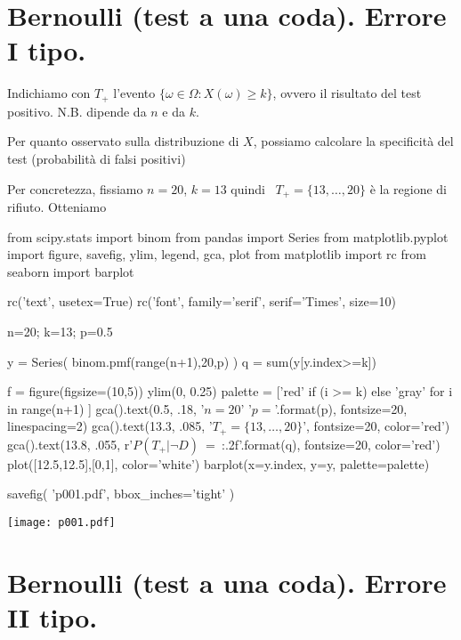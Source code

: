 \documentclass[10pt,openany]{book}
\theoremstyle{mio}
\theoremstyle{liscio}
\begin{document}
\clearpage\section{Bernoulli (test a una coda). Errore I tipo.}

Indichiamo con $T_+$ l'evento $\{\omega\in\Omega: X(\omega)\ge k\}$, ovvero il risultato del test positivo. N.B. dipende da $n$ e da $k$.

Per quanto osservato sulla distribuzione di $X$, possiamo calcolare la specificità del test (probabilità di falsi positivi)



Per concretezza, fissiamo $n=20$, $k=13$ quindi {\color{red}\boldmath\ $T_+=\{13,\dots,20\}$} è la regione di rifiuto. Otteniamo %



\begin{pycode}
from scipy.stats import binom
from pandas import Series
from matplotlib.pyplot import figure, savefig, ylim, legend, gca, plot
from matplotlib import rc
from seaborn import barplot

rc('text', usetex=True)
rc('font', family='serif', serif='Times', size=10)


n=20; k=13; p=0.5

y = Series( binom.pmf(range(n+1),20,p) )
q = sum(y[y.index>=k])

f = figure(figsize=(10,5))
ylim(0, 0.25)
palette = ['red' if (i >= k) else 'gray' for i in range(n+1) ]
gca().text(0.5, .18, '$n=20$\n' '$p={}$'.format(p), fontsize=20, linespacing=2)
gca().text(13.3, .085, '$T_+=\{13,\dots,20\}$', fontsize=20, color='red')
gca().text(13.8, .055, r'$P(T_+|\neg D)$\ =\ {:.2f}'.format(q), fontsize=20, color='red')
plot([12.5,12.5],[0,1], color='white')
barplot(x=y.index, y=y, palette=palette)

savefig( 'p001.pdf', bbox_inches='tight' )
\end{pycode}
\hfil\texttt{[image: p001.pdf]}


\clearpage\section{Bernoulli (test a  una coda). Errore II tipo.}
\end{document}
